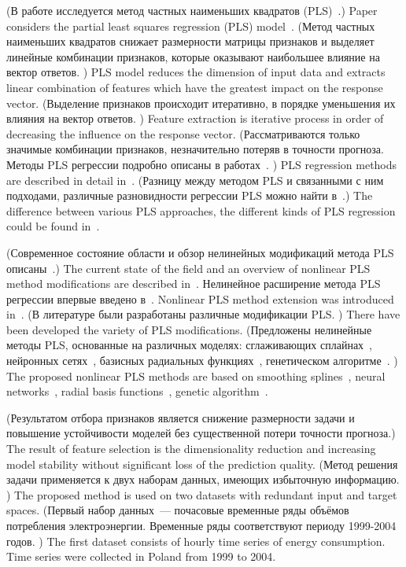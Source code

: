 \documentclass[12pt,twoside]{article}
\begin{document}
(В работе исследуется метод частных наименьших квадратов (PLS)~\cite{wegelin2000survey,abdi2003pls,geladi1986partial}.)
Paper considers the partial least squares regression (PLS) model~\cite{wegelin2000survey,abdi2003pls,geladi1986partial}.
(Метод частных наименьших квадратов снижает размерности матрицы признаков и выделяет линейные комбинации признаков, которые оказывают наибольшее влияние на вектор ответов. )
PLS model reduces the dimension of input data and extracts linear combination of features which have the greatest impact on the response vector.
(Выделение признаков происходит итеративно, в порядке уменьшения их влияния на вектор ответов. )
Feature extraction is iterative process in order of decreasing the influence on the response vector.
(Рассматриваются только значимые комбинации признаков, незначительно потеряв в точности прогноза.
Методы PLS регрессии подробно описаны в работах~\cite{geladi1988pls, hoskuldsson1988plsr,de1993simpls}. )
PLS regression methods are described in detail in~\cite{geladi1988pls, hoskuldsson1988plsr,de1993simpls}.
(Разницу между методом PLS и связанными с ним подходами, различные разновидности регрессии PLS можно найти в~\cite{rosipal2006overview}.)
The difference between various PLS approaches, the different kinds of PLS regression could be found in~\cite{rosipal2006overview}.

(Современное состояние области и обзор нелинейных модификаций метода PLS описаны~\cite{rosipal2011npls}.)
The current state of the field and an overview of nonlinear PLS method modifications are described in~\cite{rosipal2011npls}.
Нелинейное расширение метода PLS регрессии впервые введено в~\cite{wold1989nonlinear}. 
Nonlinear PLS method extension was introduced in~\cite{wold1989nonlinear}.
(В литературе были разработаны различные модификации PLS. )
There have been developed the variety of PLS modifications.
(Предложены нелинейные методы PLS, основанные на различных моделях: 
сглаживающих сплайнах~\cite{frank1990npls}, нейронных сетях~\cite{qin1992npls}, базисных радиальных функциях~\cite{yan2003geneticpls}, генетическом алгоритме~\cite{hiden1998geneticpls}. )
The proposed nonlinear PLS methods are based on smoothing splines~\cite{frank1990npls}, neural networks~\cite{qin1992npls}, radial basis functions~\cite{yan2003geneticpls}, genetic algorithm~\cite{hiden1998geneticpls}.

(Результатом отбора признаков является снижение размерности задачи и повышение устойчивости моделей без существенной потери точности прогноза.)
The result of feature selection is the dimensionality reduction and increasing model stability without significant loss of the prediction quality.
(Метод решения задачи применяется к двух наборам данных, имеющих избыточную информацию. )
The proposed method is used on two datasets with redundant input and target spaces.
(Первый набор данных~--- почасовые временные ряды объёмов потребления электроэнергии. 
Временные ряды соответствуют периоду 1999-2004 годов. )
The first dataset consists of hourly time series of energy consumption. 
Time series were collected in Poland from 1999 to 2004.
\end{document}
